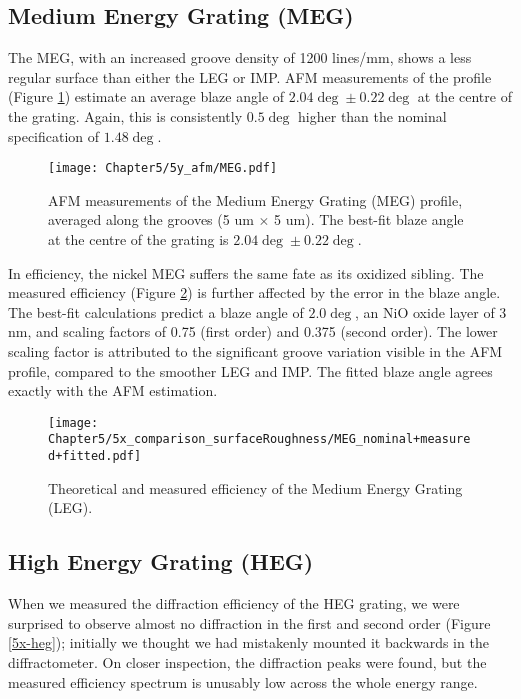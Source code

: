 \subsection{Medium Energy Grating (MEG)}
The MEG, with an increased groove density of 1200 lines/mm, shows a less regular surface than either the LEG or IMP.  AFM measurements of the profile (Figure \ref{5y-meg}) estimate an average blaze angle of $2.04\deg \pm 0.22\deg$ at the centre of the grating.  Again, this is consistently $0.5\deg$ higher than the nominal specification of $1.48\deg$.

\begin{figure}[htbp] %
   \centering
   \texttt{[image: Chapter5/5y\_afm/MEG.pdf]} 
   \caption{AFM measurements of the Medium Energy Grating (MEG) profile, averaged along the grooves (5 um $\times$ 5 um).  The best-fit blaze angle at the centre of the grating is $2.04\deg \pm 0.22\deg$.}
   \label{5y-meg}
\end{figure}

In efficiency, the nickel MEG suffers the same fate as its oxidized sibling.  The measured efficiency (Figure \ref{5x-meg}) is further affected by the error in the blaze angle.  The best-fit calculations predict a blaze angle of $2.0\deg$, an NiO oxide layer of 3 nm, and scaling factors of 0.75 (first order) and 0.375 (second order).  The lower scaling factor is attributed to the significant groove variation visible in the AFM profile, compared to the smoother LEG and IMP.  The fitted blaze angle agrees exactly with the AFM estimation.

\begin{figure}[htbp] %
   \centering
   \texttt{[image: Chapter5/5x\_comparison\_surfaceRoughness/MEG\_nominal+measured+fitted.pdf]} 
   \caption{Theoretical and measured efficiency of the Medium Energy Grating (LEG).}
   \label{5x-meg}
\end{figure}

\subsection{High Energy Grating (HEG)}
When we measured the diffraction efficiency of the HEG grating, we were surprised to observe almost no diffraction in the first and second order (Figure \ref{5x-heg}); initially we thought we had mistakenly mounted it backwards in the diffractometer.  On closer inspection, the diffraction peaks were found, but the measured efficiency spectrum is unusably low across the whole energy range.

